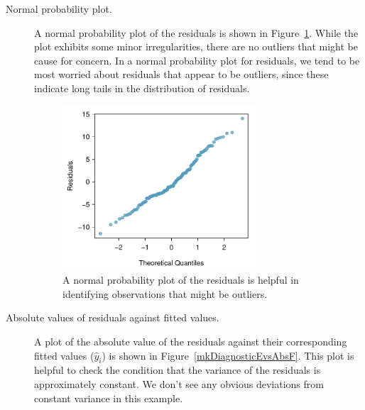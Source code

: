 \begin{description}
\item[Normal probability plot.] A normal probability plot of the residuals is shown in Figure~\ref{mkDiagnosticNormalQuantilePlot}. While the plot exhibits some minor irregularities, there are no outliers that might be cause for concern. In a normal probability plot for residuals, we tend to be most worried about residuals that appear to be outliers, since these indicate long tails in the distribution of residuals.

\begin{figure}[h]
\centering
\includegraphics[width=0.71\textwidth]{ch_regr_mult_and_log/figures/marioKartDiagnostics/mkDiagnosticNormalQuantilePlot}
\caption{A normal probability plot of the residuals is helpful in identifying observations that might be outliers.}
\label{mkDiagnosticNormalQuantilePlot}
\end{figure}

\item[Absolute values of residuals against fitted values.] A plot of the absolute value of the residuals against their corresponding fitted values ($\hat{y}_i$) is shown in Figure~\ref{mkDiagnosticEvsAbsF}. This plot is helpful to check the condition that the variance of the residuals is approximately constant. We don't see any obvious deviations from constant variance in this example.


\end{description}
